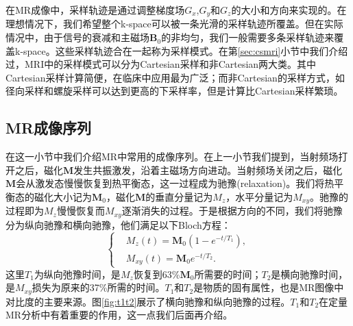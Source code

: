 在MR成像中，采样轨迹是通过调整梯度场$G_x$,$G_y$和$G_z$的大小和方向来实现的。在理想情况下，我们希望整个k-space可以被一条光滑的采样轨迹所覆盖。但在实际情况中，由于信号的衰减和主磁场$\mathrm{\textbf{B}}_0$的非均匀，我们一般需要多条采样轨迹来覆盖k-space。这些采样轨迹合在一起称为采样模式。在第\ref{sec:csmri}小节中我们介绍过，MRI中的采样模式可以分为Cartesian采样和非Cartesian两大类。其中Cartesian采样计算简便，在临床中应用最为广泛；而非Cartesian的采样方式，如径向采样和螺旋采样可以达到更高的下采样率，但是计算比Cartesian采样繁琐。

\subsection{MR成像序列}
在这一小节中我们介绍MR中常用的成像序列。在上一小节我们提到，当射频场打开之后，磁化$\mathrm{\textbf{M}}$发生共振激发，沿着主磁场方向进动。当射频场关闭之后，磁化$\mathrm{\textbf{M}}$会从激发态慢慢恢复到热平衡态，这一过程成为驰豫(relaxation)。我们将热平衡态的磁化大小记为$\mathrm{\textbf{M}}_0$，磁化$\mathrm{\textbf{M}}$的垂直分量记为$M_z$，水平分量记为$M_{xy}$。驰豫的过程即为$M_z$慢慢恢复而$M_{xy}$逐渐消失的过程。于是根据方向的不同，我们将驰豫分为纵向驰豫和横向驰豫，他们满足以下Bloch方程\cite{bloch}：
\begin{equation}
\left\{
\begin{aligned}
	&M_z(t)=\mathrm{\textbf{M}}_0(1-e^{-t/T_1}),\\
	&M_{xy}(t)=\mathrm{\textbf{M}}_0e^{-t/T_2}.
\end{aligned}
\right.
\end{equation}
这里$T_1$为纵向弛豫时间，是$M_z$恢复到63\%$\mathrm{\textbf{M}}_0$所需要的时间；$T_2$是横向驰豫时间，是$M_{xy}$损失为原来的37\%所需的时间。$T_1$和$T_2$是物质的固有属性，也是MR图像中对比度的主要来源。图\ref{fig:t1t2}展示了横向驰豫和纵向驰豫的过程。$T_1$和$T_2$在定量MR分析中有着重要的作用，这一点我们后面再介绍。

